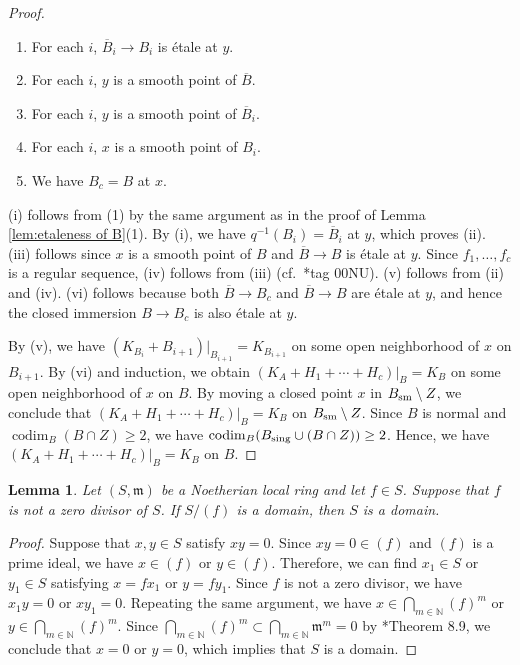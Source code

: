 \documentclass[a4paper,11pt]{amsart}
\newtheorem{lem}[thm]{Lemma}
\theoremstyle{definition}
\theoremstyle{remark}
\begin{document}
\begin{proof}
\begin{enumerate}
\item[(ii)] 
For each $i$, $\overline{B}_i\to B_i$ is \'{e}tale at $y$. 

\item[(iii)] 
For each $i$, $y$ is a smooth point of $\overline{B}$. 

\item[(iv)]
For each $i$, $y$ is a smooth point of $\overline{B}_i$. 

\item[(v)]
For each $i$, $x$ is a smooth point of $B_i$. 

\item[(vi)]
We have $B_c = B$ at $x$.  
\end{enumerate}
(i) follows from (1) by the same argument as in the proof of Lemma \ref{lem:etaleness of B}(1). 
By (i), we have $q^{-1}(B_i) = \overline{B}_i$ at $y$, which proves (ii). 
(iii) follows since $x$ is a smooth point of $B$ and $\overline{B}\to B$ is \'{e}tale at $y$. 
Since $f_1, \ldots, f_c$ is a regular sequence, (iv) follows from (iii) (cf.\ \cite{Sta}*{tag 00NU}). (v) follows from (ii) and (iv). 
(vi) follows because both $\overline{B}\to B_c$ and $\overline{B}\to B$ are \'{e}tale at $y$, and hence the closed immersion $B \to B_c$ is also \'{e}tale at $y$.

By (v), we have $(K_{B_i}+B_{i+1})|_{B_{i+1}}=K_{B_{i+1}}$ on some open neighborhood of $x$ on $B_{i+1}$.
By (vi) and induction, we obtain $(K_A+H_1+\cdots +H_c)|_B = K_B$ on some open neighborhood of $x$ on $B$.
By moving a closed point $x$ in $B_{\rm sm}\setminus Z$, 
we conclude that $(K_A+H_1+\cdots +H_c)|_B=K_B$ on $B_{\rm sm}\setminus Z$. 
Since $B$ is normal and $\operatorname{codim} _B (B \cap Z) \ge 2$, we have $\operatorname{codim} _B(B_{\rm sing}\cup (B \cap Z))\ge 2$.
Hence, we have $(K_A+H_1+\cdots +H_c)|_B=K_B$ on $B$.
\end{proof}

\begin{lem}\label{lem:domain}
Let $(S,\mathfrak m)$ be a Noetherian local ring and let $f\in S$.
Suppose that $f$ is not a zero divisor of $S$.
If $S/(f)$ is a domain, then $S$ is a domain.
\end{lem}

\begin{proof}
Suppose that $x,y\in S$ satisfy $xy=0$.
Since $xy = 0 \in (f)$ and $(f)$ is a prime ideal, we have $x\in (f)$ or $y\in (f)$. 
Therefore, we can find $x_1 \in S$ or $y_1 \in S$ satisfying $x=fx_1$ or $y=fy_1$.
Since $f$ is not a zero divisor, we have $x_1y=0$ or $xy_1=0$.
Repeating the same argument, we have $x\in \bigcap _{m\in\mathbb N} (f)^m$ or $y\in \bigcap_{m\in\mathbb N}(f)^m$.
Since $\bigcap_{m\in\mathbb N} (f)^m\subset\bigcap_{m\in\mathbb N} \mathfrak m^m=0$ by \cite{Mat89}*{Theorem 8.9}, 
we conclude that $x=0$ or $y=0$, which implies that $S$ is a domain.
\end{proof}
\end{document}
